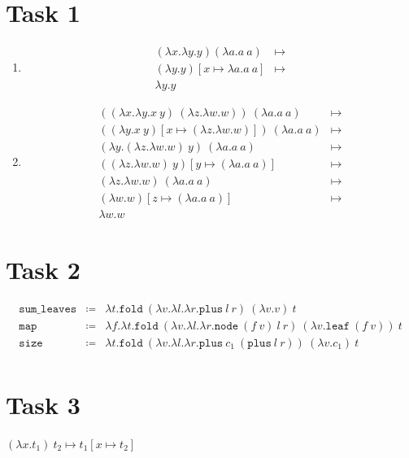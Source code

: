 \documentclass{article}
\begin{document}
\section*{Task 1}
\begin{enumerate}
\item 
  \begin{align*}
    (\lambda x.\lambda y.y) (\lambda a.a\ a) & \mapsto\\
    (\lambda y.y)[x\mapsto \lambda a.a\ a] & \mapsto \\
    \lambda y.y
  \end{align*}

\item 
  \begin{align*}
    ((\lambda x.\lambda y.x\ y)\ (\lambda z.\lambda w.w))\ (\lambda a.a\ a) & \mapsto \\
    ((\lambda y.x\ y)[x \mapsto (\lambda z.\lambda w.w)])\ (\lambda a.a\ a) & \mapsto \\ 
    (\lambda y. (\lambda z.\lambda w.w)\ y)\ (\lambda a.a\ a) & \mapsto \\ 
    ((\lambda z.\lambda w.w)\ y)[y \mapsto (\lambda a.a\ a)]& \mapsto \\
    (\lambda z.\lambda w.w)\ (\lambda a.a\ a) & \mapsto \\
    (\lambda w.w)[z \mapsto (\lambda a.a\ a)] & \mapsto\\
    \lambda w.w
  \end{align*}
\end{enumerate}

\section*{Task 2}
\begin{align*}
  \mathtt{sum\_leaves} & \coloneq & \lambda t.\mathtt{fold}\ (\lambda v.\lambda l.\lambda r. \mathtt{plus}\ l\ r)\ (\lambda v.v)\ t\\ 
  \mathtt{map} & \coloneq & \lambda f.\lambda t.\mathtt{fold}\ (\lambda v.\lambda l.\lambda r.\mathtt{node}\ (f\ v)\ l\ r)\ (\lambda v.\mathtt{leaf}\ (f\ v))\ t\\
  \mathtt{size} & \coloneq & \lambda t. \mathtt{fold}\ (\lambda v.\lambda l.\lambda r. \mathtt{plus}\ c_1\ (\mathtt{plus}\ l\ r))\ (\lambda v.c_1)\ t\\
\end{align*}

\section*{Task 3}
\begin{minipage}{\textwidth}
  \begin{minipage}{0.45\textwidth}
    \begin{prooftree}
    \end{prooftree}
  \end{minipage}
  \hfill
  \begin{minipage}{0.45\textwidth}
    $(\lambda x.t_1)\ t_2 \mapsto t_1[x \mapsto t_2]$
  \end{minipage}
\end{minipage}
\end{document}
